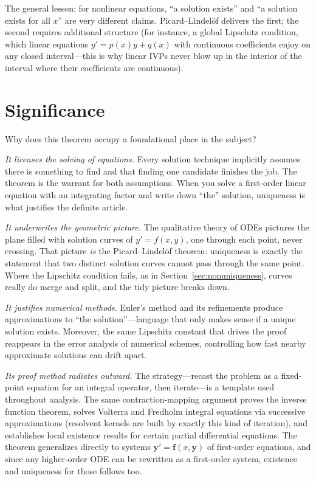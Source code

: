 \documentclass{essay}
\begin{document}
The general lesson: for nonlinear equations, ``a solution exists'' and ``a solution exists for all \(x\)'' are very different claims. Picard--Lindel\"of delivers the first; the second requires additional structure (for instance, a global Lipschitz condition, which linear equations \(y' = p(x)y + q(x)\) with continuous coefficients enjoy on any closed interval---this is why linear IVPs never blow up in the interior of the interval where their coefficients are continuous).

\section{Significance}

Why does this theorem occupy a foundational place in the subject?

\emph{It licenses the solving of equations.} Every solution technique implicitly assumes there is something to find and that finding one candidate finishes the job. The theorem is the warrant for both assumptions. When you solve a first-order linear equation with an integrating factor and write down ``the'' solution, uniqueness is what justifies the definite article.

\emph{It underwrites the geometric picture.} The qualitative theory of ODEs pictures the plane filled with solution curves of \(y' = f(x,y)\), one through each point, never crossing. That picture \emph{is} the Picard--Lindel\"of theorem: uniqueness is exactly the statement that two distinct solution curves cannot pass through the same point. Where the Lipschitz condition fails, as in Section~\ref{sec:nonuniqueness}, curves really do merge and split, and the tidy picture breaks down.

\emph{It justifies numerical methods.} Euler's method and its refinements produce approximations to ``the solution''---language that only makes sense if a unique solution exists. Moreover, the same Lipschitz constant that drives the proof reappears in the error analysis of numerical schemes, controlling how fast nearby approximate solutions can drift apart.

\emph{Its proof method radiates outward.} The strategy---recast the problem as a fixed-point equation for an integral operator, then iterate---is a template used throughout analysis. The same contraction-mapping argument proves the inverse function theorem, solves Volterra and Fredholm integral equations via successive approximations (resolvent kernels are built by exactly this kind of iteration), and establishes local existence results for certain partial differential equations. The theorem generalizes directly to systems \(\mathbf{y}' = \mathbf{f}(x, \mathbf{y})\) of first-order equations, and since any higher-order ODE can be rewritten as a first-order system, existence and uniqueness for those follows too.
\end{document}
